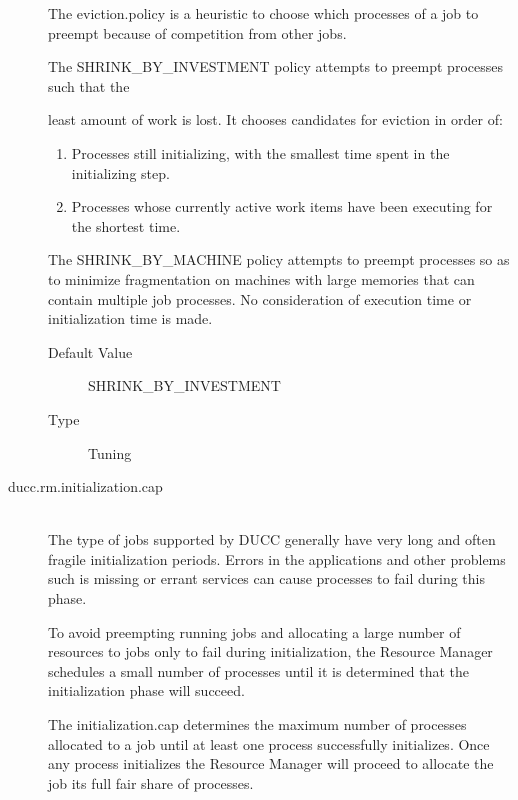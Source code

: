 \begin{description}
          The eviction.policy is a heuristic to choose which processes of a job to preempt because of 
          competition from other jobs. 
          
          The SHRINK\_BY\_INVESTMENT policy attempts to preempt processes such that the 
          
          least amount of work is lost. It chooses candidates for eviction in order of: 
          \begin{enumerate}
            \item Processes still initializing, with the smallest time spent in the initializing step. 
            \item Processes whose currently active work items have been executing for the shortest 
              time.
            \end{enumerate}
            The SHRINK\_BY\_MACHINE policy attempts to preempt processes so as to minimize 
            fragmentation on machines with large memories that can contain multiple job processes. 
            No consideration of execution time or initialization time is made.             
          \begin{description}
            \item[Default Value] SHRINK\_BY\_INVESTMENT 
            \item[Type] Tuning 
          \end{description}
          

        \item[ducc.rm.initialization.cap] \hfill \\
          The type of jobs supported by DUCC generally have very long and often fragile 
          initialization periods. Errors in the applications and other problems such is missing or 
          errant services can cause processes to fail during this phase. 
          
          To avoid preempting running jobs and allocating a large number of resources to jobs only 
          to fail during initialization, the Resource Manager schedules a small number of processes 
          until it is determined that the initialization phase will succeed. 
          
          The initialization.cap determines the maximum number of processes allocated to a job 
          until at least one process successfully initializes. Once any process initializes the Resource 
          Manager will proceed to allocate the job its full fair share of processes. 
          

\end{description}
